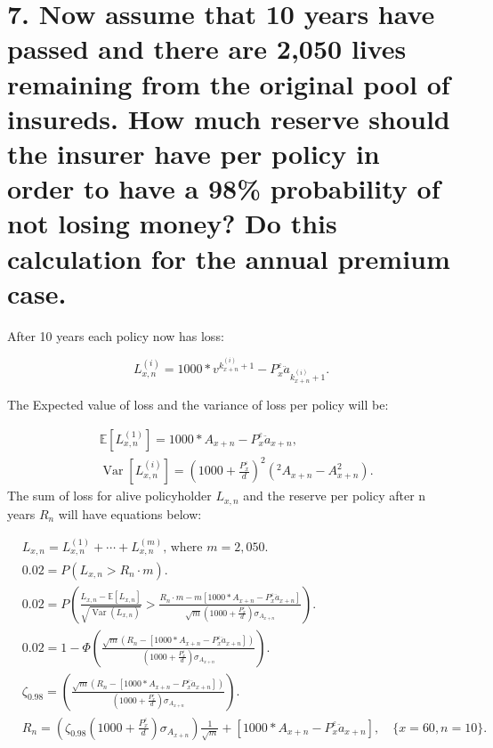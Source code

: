 \documentclass[
]{article}
\begin{document}
\hypertarget{now-assume-that-10-years-have-passed-and-there-are-2050-lives-remaining-from-the-original-pool-of-insureds.-how-much-reserve-should-the-insurer-have-per-policy-in-order-to-have-a-98-probability-of-not-losing-money-do-this-calculation-for-the-annual-premium-case.}{%
\section{7. Now assume that 10 years have passed and there are 2,050
lives remaining from the original pool of insureds. How much reserve
should the insurer have per policy in order to have a 98\% probability
of not losing money? Do this calculation for the annual premium
case.}\label{now-assume-that-10-years-have-passed-and-there-are-2050-lives-remaining-from-the-original-pool-of-insureds.-how-much-reserve-should-the-insurer-have-per-policy-in-order-to-have-a-98-probability-of-not-losing-money-do-this-calculation-for-the-annual-premium-case.}}

After 10 years each policy now has loss:

\[
L_{x, n}^{(i)}=1000*v^{k^{(i)}_{x+n}+1}-P_x^{\varepsilon} \ddot{a} _{k^{(i)}_{x+n}+1}.
\]

The Expected value of loss and the variance of loss per policy will be:

\[
\begin{aligned}
& \mathbb{E}\left[L_{x, n}^{(1)}\right]=1000*A_{x+n}-P_x^{\varepsilon} \ddot{a}_{x+n}, \\
& \operatorname{Var}\left[L_{x, n}^{(i)}\right]=\left(1000+\frac{P_x^{\varepsilon}}{d}\right)^2\left({}^2A_{x+n}-A_{x+n}^2\right).
\end{aligned}
\] The sum of loss for alive policyholder \(L_{x,n}\) and the reserve
per policy after n years \(R_n\) will have equations below:

\[
\begin{aligned}
& L_{x, n}=L_{x, n}^{(1)}+\cdots+L_{x, n}^{(m)} \text{, where } m=2,050. \\
& 0.02=P\left(L_{x, n}>R_n \cdot m\right). \\
& 0.02=P\left(\frac{L_{x, n}-\mathbb{E}\left[L_{x, n}\right]}{\sqrt{\operatorname{Var}\left(L_{x, n}\right)}}>\frac{R_n \cdot m-m\left[1000*A_{x+n}-P_x^{\varepsilon} \ddot{a}_{x+n}\right]}{\sqrt{m}\left(1000+\frac{P_{x}^{\varepsilon}}{d}\right) \sigma_{A_{x+n}}}\right). \\
& 0.02=1-\Phi\left(\frac{\sqrt{m}\left(R_n-\left[1000*A_{x+n}-P_x^{\varepsilon} \ddot{a}_{x+n}\right]\right)}{\left(1000+\frac{P_x^{\varepsilon}}{d}\right) \sigma_{A_{x+n}}}\right). \\
& \zeta_{0.98} =\left(\frac{\sqrt{m}\left(R_n-\left[1000*A_{x+n}-P_x^{\varepsilon} \ddot{a}_{x+n}\right]\right)}{\left(1000+\frac{P_x^{\varepsilon}}{d}\right) \sigma_{A_{x+n}}}\right). \\
& R_n=\left(\zeta_{0.98}\left(1000+\frac{P_x^{\varepsilon}}{d}\right) \sigma_{A_{x+n}}\right) \frac{1}{\sqrt{m}}+\left[1000*A_{x+n}-P_x^{\varepsilon} \ddot{a}_{x+n}\right], \quad\{x=60, n=10\}.
\end{aligned} 
\]
\end{document}
